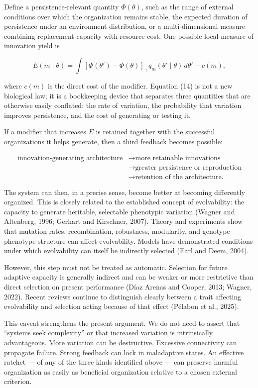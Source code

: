 \documentclass[11pt]{article}
\begin{document}
Define a persistence-relevant quantity \(\Phi(\theta)\), such as the
range of external conditions over which the organization remains stable,
the expected duration of persistence under an environment distribution,
or a multi-dimensional measure combining replacement capacity with
resource cost. One possible local measure of innovation yield is

\[
E(m \mid \theta) = \int \left[\Phi(\theta') - \Phi(\theta)\right]_+ q_m(\theta' \mid \theta)\, d\theta' - c(m), \tag{14}
\]

where \(c(m)\) is the direct cost of the modifier. Equation (14) is not
a new biological law; it is a bookkeeping device that separates three
quantities that are otherwise easily conflated: the rate of variation,
the probability that variation improves persistence, and the cost of
generating or testing it.

If a modifier that increases \(E\) is retained together with the
successful organizations it helps generate, then a third feedback
becomes possible:

\[
\begin{aligned}
\text{innovation-generating architecture}
&\to \text{more retainable innovations}\\
&\to \text{greater persistence or reproduction}\\
&\to \text{retention of the architecture.}
\end{aligned}
\]

The system can then, in a precise sense, become better at becoming
differently organized. This is closely related to the established
concept of evolvability: the capacity to generate heritable, selectable
phenotypic variation (Wagner and Altenberg, 1996; Gerhart and Kirschner,
2007). Theory and experiments show that mutation rates, recombination,
robustness, modularity, and genotype--phenotype structure can affect
evolvability. Models have demonstrated conditions under which
evolvability can itself be indirectly selected (Earl and Deem, 2004).

However, this step must not be treated as automatic. Selection for
future adaptive capacity is generally indirect and can be weaker or more
restrictive than direct selection on present performance (Díaz Arenas
and Cooper, 2013; Wagner, 2022). Recent reviews continue to distinguish
clearly between a trait affecting evolvability and selection acting
because of that effect (Pélabon et al., 2025).

This caveat strengthens the present argument. We do not need to assert
that ``systems seek complexity'' or that increased variation is
intrinsically advantageous. More variation can be destructive. Excessive
connectivity can propagate failure. Strong feedback can lock in
maladaptive states. An effective ratchet --- of any of the three kinds
identified above --- can preserve harmful organization as easily as
beneficial organization relative to a chosen external criterion.
\end{document}
